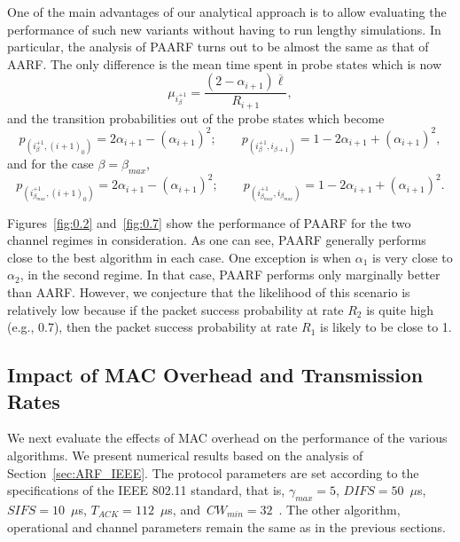 \documentclass[11pt, journal, letterpaper, oneside, onecolumn]{IEEEtran}
\begin{document}
One of the main advantages of our analytical approach is to allow
evaluating the performance of such new variants without having to
run lengthy simulations. In particular, the analysis of PAARF turns out to be
almost the same as that of AARF. The only difference is the mean
time spent in probe states which is now
\begin{equation}
\mu_{i^{+1}_{\beta}}=\frac{(2-\alpha_{i+1})\overline{\ell}}{R_{i+1}},
\end{equation}
and the transition probabilities out of  the probe states which
become
\begin{equation}
p_{(i^{+1}_{\beta},(i+1)_0)}  =
2\alpha_{i+1}-(\alpha_{i+1})^2; \qquad
p_{(i^{+1}_{\beta},i_{\beta+1})}  =  1-
2\alpha_{i+1}+(\alpha_{i+1})^2,
\end{equation}
and for the case $\beta=\beta_{max}$,
\begin{equation}
p_{(i^{+1}_{\beta_{max}},(i+1)_0)} =
2\alpha_{i+1}-(\alpha_{i+1})^2; \qquad
p_{(i^{+1}_{\beta_{max}},i_{\beta_{max}})} =  1-
2\alpha_{i+1}+(\alpha_{i+1})^2.
\end{equation}

Figures~\ref{fig:0.2} and~\ref{fig:0.7} show the performance of
PAARF for the two channel regimes in consideration. As one can
see, PAARF generally performs close to the best algorithm in each
case.  One exception is when $\alpha_1$ is very close to
$\alpha_2$, in the second regime. In that case, PAARF performs
only marginally better than AARF. However, we conjecture that the
likelihood of this scenario is relatively low because if the
packet success probability at rate $R_2$ is quite high (e.g.,
0.7), then the packet success probability at rate $R_1$ is likely
to be close to 1.



\subsection{Impact of MAC Overhead and Transmission Rates}
\label{sec:impact}
We next evaluate the effects of MAC overhead on the performance of the various algorithms. We present numerical results based on the analysis of Section~\ref{sec:ARF_IEEE}. The protocol
parameters are set according to the specifications of the IEEE 802.11 standard, that is, $\gamma_{max}=5$, $DIFS=50$~$\mu$s, $SIFS=10$~$\mu$s, $T_{ACK}=112$~$\mu$s, and~$CW_{min}=32$~\cite{ieee:80211}.
The other algorithm, operational and channel parameters remain the same as in the previous sections.
\end{document}
